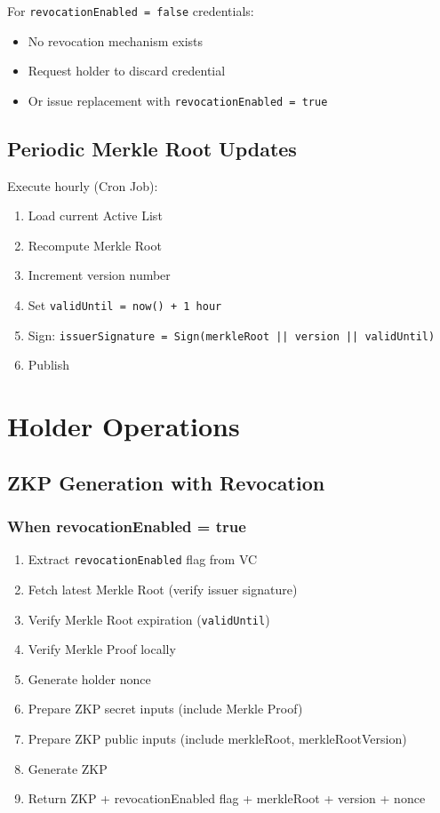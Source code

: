 For \texttt{revocationEnabled = false} credentials:

\begin{itemize}
  \item No revocation mechanism exists
  \item Request holder to discard credential
  \item Or issue replacement with \texttt{revocationEnabled = true}
\end{itemize}

\subsection{Periodic Merkle Root Updates}

Execute hourly (Cron Job):

\begin{enumerate}
  \item Load current Active List
  \item Recompute Merkle Root
  \item Increment version number
  \item Set \texttt{validUntil = now() + 1 hour}
  \item Sign: \texttt{issuerSignature = Sign(merkleRoot || version || validUntil)}
  \item Publish
\end{enumerate}

\section{Holder Operations}

\subsection{ZKP Generation with Revocation}

\subsubsection{When revocationEnabled = true}

\begin{enumerate}
  \item Extract \texttt{revocationEnabled} flag from VC
  \item Fetch latest Merkle Root (verify issuer signature)
  \item Verify Merkle Root expiration (\texttt{validUntil})
  \item Verify Merkle Proof locally
  \item Generate holder nonce
  \item Prepare ZKP secret inputs (include Merkle Proof)
  \item Prepare ZKP public inputs (include merkleRoot, merkleRootVersion)
  \item Generate ZKP
  \item Return ZKP + revocationEnabled flag + merkleRoot + version + nonce
\end{enumerate}

